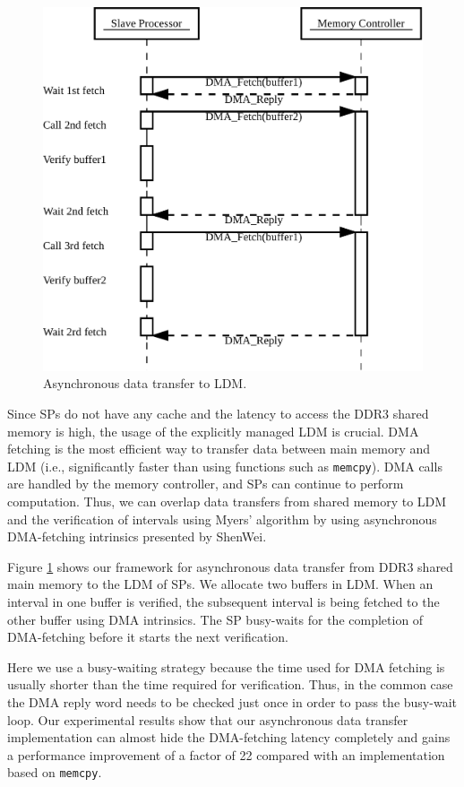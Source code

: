 \begin{figure}[!htb]
  \includegraphics[width=1\linewidth]{figures/AsyncTrans}
  \caption{Asynchronous data transfer to LDM.}
  \label{AsyncTrans}
\end{figure}

Since SPs do not have any cache and the latency to access the DDR3
shared memory is high, the usage of the explicitly managed LDM is
crucial.  DMA fetching is the most efficient way to transfer data
between main memory and LDM (i.e., significantly faster than using
functions such as \texttt{memcpy}). DMA calls are handled by the
memory controller, and SPs can continue to perform computation. Thus,
we can overlap data transfers from shared memory to LDM and the
verification of intervals using Myers' algorithm by using asynchronous
DMA-fetching intrinsics presented by ShenWei.

Figure \ref{AsyncTrans} shows our framework for asynchronous data
transfer from DDR3 shared main memory to the LDM of SPs. We allocate
two buffers in LDM. When an interval in one buffer is verified, the
subsequent interval is being fetched to the other buffer using DMA
intrinsics. The SP busy-waits for the completion of DMA-fetching
before it starts the next verification.

Here we use a busy-waiting strategy because the time used for DMA
fetching is usually shorter than the time required for
verification. Thus, in the common case the DMA reply word needs to be
checked just once in order to pass the busy-wait loop. Our
experimental results show that our asynchronous data transfer
implementation can almost hide the DMA-fetching latency completely and
gains a performance improvement of a factor of 22 compared with an
implementation based on \texttt{memcpy}.
